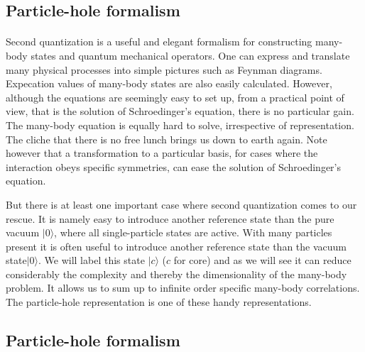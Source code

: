 \documentclass[%
twoside,                 %
final,                   %
10pt]{article}
\begin{document}
\subsection{Particle-hole formalism}

\paragraph{}
Second quantization is a useful and elegant formalism  for constructing many-body  states and 
quantum mechanical operators. One can express and translate many physical processes
into simple pictures such as Feynman diagrams. Expecation values of many-body states are also easily calculated.
However, although the equations are seemingly easy to set up, from  a practical point of view, that is
the solution of Schroedinger's equation, there is no particular gain.
The many-body equation is equally hard to solve, irrespective of representation. 
The cliche that 
there is no free lunch brings us down to earth again.  
Note however that a transformation to a particular
basis, for cases where the interaction obeys specific symmetries, can ease the solution of Schroedinger's equation. 

But there is at least one important case where second quantization comes to our rescue.
It is namely easy to introduce another reference state than the pure vacuum $|0\rangle $, where all single-particle states are active.
With many particles present it is often useful to introduce another reference state  than the vacuum state$|0\rangle $. We will label this state $|c\rangle$ ($c$ for core) and as we will see it can reduce 
considerably the complexity and thereby the dimensionality of the many-body problem. It allows us to sum up to infinite order specific many-body correlations.  The particle-hole representation is one of these handy representations.



\subsection{Particle-hole formalism}

\end{document}

